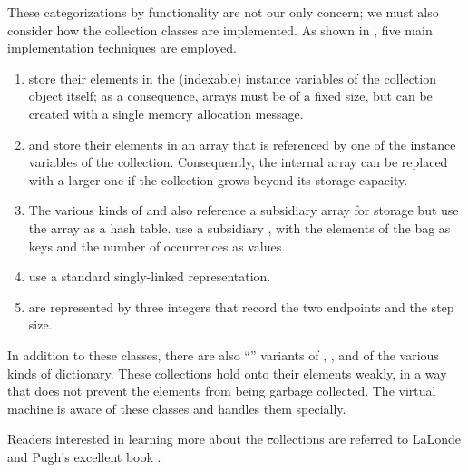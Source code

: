 \documentclass[a4paper,10pt,twoside]{book}
\begin{document}
These categorizations by functionality are not our only concern; we must also consider how the collection classes are implemented.
As shown in , five main implementation techniques are employed.

\begin{enumerate}
  \item {} store their elements in the (indexable) instance variables of the collection object itself; as a consequence, arrays must be of a fixed size, but can be created with a single memory allocation message.
  \item {} and  store their elements in an array that is referenced by one of the instance variables of the collection.
  Consequently, the internal array can be replaced with a larger one if the collection grows beyond its storage capacity.
  \item The various kinds of  and  also reference a subsidiary array for storage but use the array as a hash table.
   use a subsidiary , with the elements of the bag as keys and the number of occurrences as values.
  \item {} use a standard singly-linked representation.
  \item {} are represented by three integers that record the two endpoints and the step size.
\end{enumerate}
In addition to these classes, there are also ``'' variants of , , and of the various kinds of dictionary.
These collections hold onto their elements weakly, \ie in a way that does not prevent the elements from being garbage collected.
The \sq virtual machine is aware of these classes and handles them specially.

Readers interested in learning more about the \st collections are referred to LaLonde and Pugh's excellent book \cite{LaLo90a}.

\end{document}
